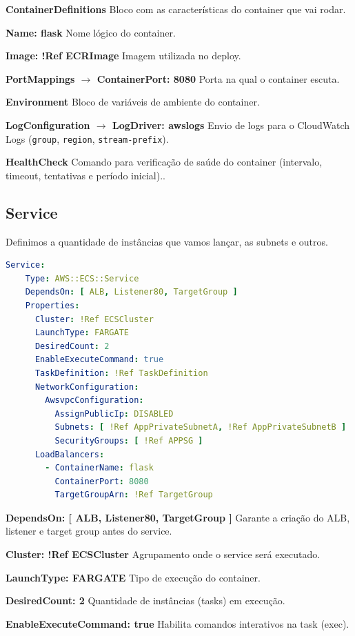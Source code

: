 \textbf{ContainerDefinitions} Bloco com as características do container que vai rodar.

\quad\textbf{Name: flask} Nome lógico do container.

\quad\textbf{Image: !Ref ECRImage} Imagem utilizada no deploy.

\quad\textbf{PortMappings \(\rightarrow\) ContainerPort: 8080} Porta na qual o container escuta.

\quad\textbf{Environment} Bloco de variáveis de ambiente do container.

\quad\textbf{LogConfiguration \(\rightarrow\) LogDriver: awslogs} Envio de logs para o CloudWatch Logs (\texttt{group}, \texttt{region}, \texttt{stream-prefix}).

\quad\textbf{HealthCheck} Comando para verificação de saúde do container (intervalo, timeout, tentativas e período inicial)..

\subsection{Service}
Definimos a quantidade de instâncias que vamos lançar, as subnets e outros.

\begin{lstlisting}[language=YAML]
Service:
    Type: AWS::ECS::Service
    DependsOn: [ ALB, Listener80, TargetGroup ]
    Properties:
      Cluster: !Ref ECSCluster
      LaunchType: FARGATE
      DesiredCount: 2
      EnableExecuteCommand: true
      TaskDefinition: !Ref TaskDefinition
      NetworkConfiguration:
        AwsvpcConfiguration:
          AssignPublicIp: DISABLED
          Subnets: [ !Ref AppPrivateSubnetA, !Ref AppPrivateSubnetB ]
          SecurityGroups: [ !Ref APPSG ]
      LoadBalancers:
        - ContainerName: flask
          ContainerPort: 8080
          TargetGroupArn: !Ref TargetGroup
\end{lstlisting}

\textbf{DependsOn: [ ALB, Listener80, TargetGroup ]} Garante a criação do ALB, listener e target group antes do service.

\textbf{Cluster: !Ref ECSCluster} Agrupamento onde o service será executado.

\textbf{LaunchType: FARGATE} Tipo de execução do container.

\textbf{DesiredCount: 2} Quantidade de instâncias (tasks) em execução.

\textbf{EnableExecuteCommand: true} Habilita comandos interativos na task (exec).

